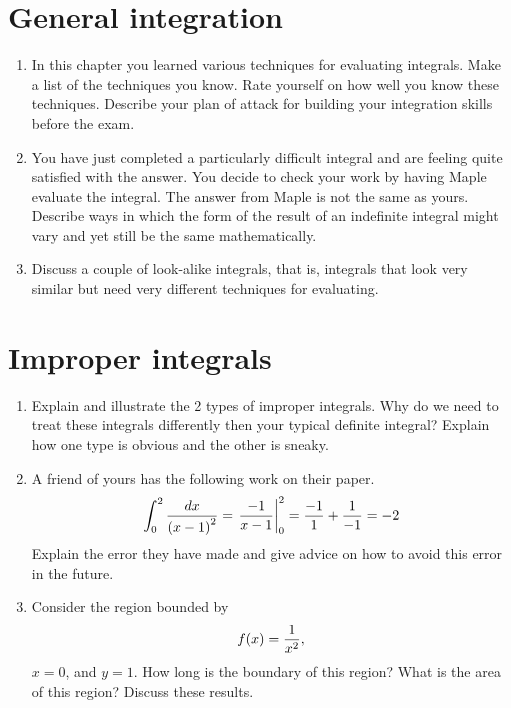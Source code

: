 \begin{enumerate}
 \end{enumerate}\section{General integration}\begin{enumerate}


\item  In this chapter you learned various techniques for evaluating integrals.  Make a list of the techniques you know.  Rate yourself on how well you know these techniques.  Describe your plan of attack for building your integration skills before the exam.

\item  You have just completed a particularly difficult integral and are feeling quite satisfied with the answer.  You decide to check your work by having Maple evaluate the integral.  The answer from Maple is not the same as yours.  Describe ways in which the form of the result of an indefinite integral might vary and yet still be the same mathematically. 

\item Discuss a couple of look-alike integrals, that is, integrals that look very similar but need very different techniques for evaluating.

\end{enumerate}\section{Improper integrals}\begin{enumerate}

\item  Explain and illustrate the 2 types of improper integrals.  Why do we need to treat these integrals differently then your typical definite integral?  Explain how one type is obvious and the other is sneaky.

\item  A friend of yours has the following work on their paper.
	$$\int_0^2 {{{dx} \over {\left( {x - 1} \right)^2 }}}  = \left. {{{ - 1} \over {x - 1}}} \right|_0^2  = {{ - 1} \over 1} + {1 \over { - 1}} =  - 2$$
Explain the error they have made and give advice on how to avoid this error in the future.

\item  Consider the region bounded by $$f(x) = {1 \over {x^2 }},$$ $x = 0$, and $y = 1$.  How long is the boundary of this region?  What is the area of this region?  Discuss these results.


\end{enumerate}
